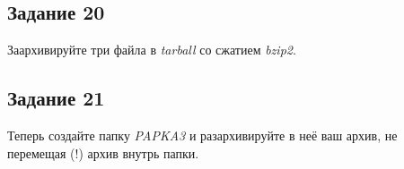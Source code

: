 \documentclass[12pt, a4paper]{report}
\begin{document}
			\subsection*{Задание 20}
			Заархивируйте три файла в \textit{tarball} со сжатием \textit{bzip2}.
	
			\subsection*{Задание 21}
			Теперь создайте папку \textit{PAPKA3} и разархивируйте в неё ваш архив, не перемещая (!) архив внутрь папки.
\end{document}

